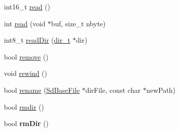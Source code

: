 \begin{DoxyCompactItemize}
int16\-\_\-t \hyperlink{class_sd_base_file_a5a4c0ff07215b20f25d11fef7710ed59}{read} ()
\item 
int \hyperlink{class_sd_base_file_a2af650686f0fc5fa748f6478f5f8afb1}{read} (void $\ast$buf, size\-\_\-t nbyte)
\item 
int8\-\_\-t \hyperlink{class_sd_base_file_addfe59dc0e7a6a8a88e9b7ecf5b51860}{read\-Dir} (\hyperlink{_sd_fat_structs_8h_a803db59d4e16a0c54a647afc6a7954e3}{dir\-\_\-t} $\ast$dir)
\item 
bool \hyperlink{class_sd_base_file_a1f9c4a4bd47b7cd9beb431504c5ae46c}{remove} ()
\item 
void \hyperlink{class_sd_base_file_ab8734e666421c9fe3b6380a818c6c727}{rewind} ()
\item 
bool \hyperlink{class_sd_base_file_a34221bbb3afb83430f8d21f59d8e5b1c}{rename} (\hyperlink{class_sd_base_file}{Sd\-Base\-File} $\ast$dir\-File, const char $\ast$new\-Path)
\item 
bool \hyperlink{class_sd_base_file_a8565ae91a87acd4ed1a648e52e51ce13}{rmdir} ()
\item 
\hypertarget{class_sd_base_file_ae2acaa045ad377689b6786197a157288}{bool {\bfseries rm\-Dir} ()}\label{class_sd_base_file_ae2acaa045ad377689b6786197a157288}


\end{DoxyCompactItemize}
